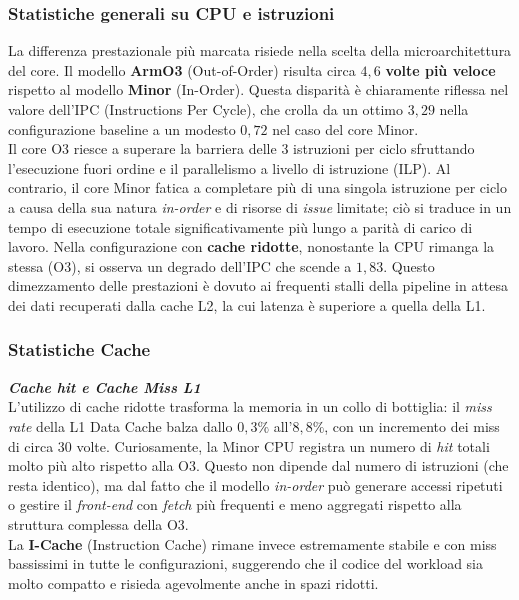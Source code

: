 \documentclass[../../main_document/main.tex]{subfiles}
\begin{document}
\subsubsection{Statistiche generali su CPU e istruzioni}

La differenza prestazionale più marcata risiede nella scelta della microarchitettura del core. Il modello \textbf{ArmO3} (Out-of-Order) risulta circa $4,6$ \textbf{volte più veloce} rispetto al modello \textbf{Minor} (In-Order). Questa disparità è chiaramente riflessa nel valore dell'IPC (Instructions Per Cycle), che crolla da un ottimo $3,29$ nella configurazione baseline a un modesto $0,72$ nel caso del core Minor.
\\
Il core O3 riesce a superare la barriera delle $3$ istruzioni per ciclo sfruttando l'esecuzione fuori ordine e il parallelismo a livello di istruzione (ILP). Al contrario, il core Minor fatica a completare più di una singola istruzione per ciclo a causa della sua natura \textit{in-order} e di risorse di \textit{issue} limitate; ciò si traduce in un tempo di esecuzione totale significativamente più lungo a parità di carico di lavoro. Nella configurazione con \textbf{cache ridotte}, nonostante la CPU rimanga la stessa (O3), si osserva un degrado dell'IPC che scende a $1,83$. Questo dimezzamento delle prestazioni è dovuto ai frequenti stalli della pipeline in attesa dei dati recuperati dalla cache L2, la cui latenza è superiore a quella della L1.

\subsubsection{Statistiche Cache}

\textbf{\textit{Cache hit e Cache Miss L1}}\\
L'utilizzo di cache ridotte trasforma la memoria in un collo di bottiglia: il \textit{miss rate} della L1 Data Cache balza dallo $0,3\%$ all'$8,8\%$, con un incremento dei miss di circa $30$ volte. Curiosamente, la Minor CPU registra un numero di \textit{hit} totali molto più alto rispetto alla O3. Questo non dipende dal numero di istruzioni (che resta identico), ma dal fatto che il modello \textit{in-order} può generare accessi ripetuti o gestire il \textit{front-end} con \textit{fetch} più frequenti e meno aggregati rispetto alla struttura complessa della O3.\\ 
La \textbf{I-Cache} (Instruction Cache) rimane invece estremamente stabile e con miss bassissimi in tutte le configurazioni, suggerendo che il codice del workload sia molto compatto e risieda agevolmente anche in spazi ridotti.
\end{document}
